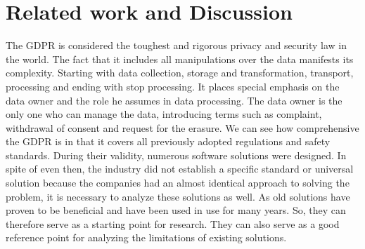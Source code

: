 \documentclass[11pt,english]{article}
\begin{document}
\section{Related work and Discussion}
The GDPR is considered the toughest and rigorous privacy and security law in the world. The fact that it includes all manipulations over the data manifests its complexity. Starting with data collection, storage and transformation, transport, processing and ending with stop processing. It places special emphasis on the data owner and the role he assumes in data processing. The data owner is the only one who can manage the data, introducing terms such as complaint, withdrawal of consent and request for the erasure. We can see how comprehensive the GDPR is in that it covers all previously adopted regulations and safety standards. During their validity, numerous software solutions were designed. In spite of even then, the industry did not establish a specific standard or universal solution because the companies had an almost identical approach to solving the problem, it is necessary to analyze these solutions as well. As old solutions have proven to be beneficial and have been used in use for many years. So, they can therefore serve as a starting point for research.  They can also serve as a good reference point for analyzing the limitations of existing solutions.
\end{document}
